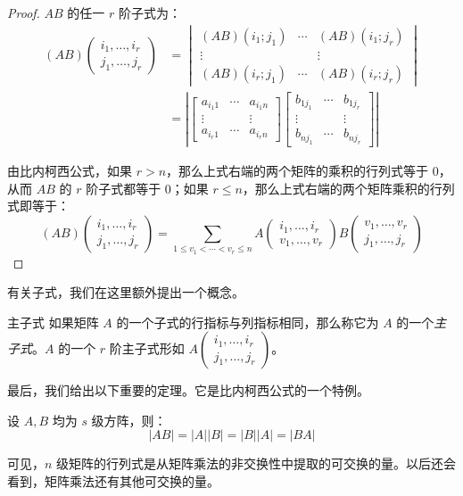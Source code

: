 \begin{proof}
	$AB$ 的任一 $r$ 阶子式为：
	$$
	\begin{aligned}
		(AB) \begin{pmatrix} i_1, \ldots, i_r \\ j_1, \ldots, j_r \end{pmatrix} &=
		\begin{vmatrix}
			(AB)(i_1; j_1) & \cdots & (AB)(i_1; j_r)
			\\
			\vdots & & \vdots
			\\
			(AB)(i_r; j_1) & \cdots & (AB)(i_r; j_r)
		\end{vmatrix}
		\\&=
		\left|
		\begin{bmatrix}
			a_{i_1 1} & \cdots & a_{i_1 n}
			\\
			\vdots & & \vdots
			\\
			a_{i_r 1} & \cdots & a_{i_r n}
		\end{bmatrix}
		\begin{bmatrix}
			b_{1 j_1} & \cdots & b_{1 j_r}
			\\
			\vdots & & \vdots
			\\
			b_{n j_1} & \cdots & b_{n j_r}
		\end{bmatrix}
		\right|
	\end{aligned}
	$$

	由比内柯西公式，如果 $r > n$，那么上式右端的两个矩阵的乘积的行列式等于 $0$，从而 $AB$ 的 $r$ 阶子式都等于 $0$；如果 $r \le n$，那么上式右端的两个矩阵乘积的行列式即等于：
	$$
	(AB) \begin{pmatrix} i_1, \ldots, i_r \\ j_1, \ldots, j_r \end{pmatrix} = \sum\limits_{1 \le v_1 < \cdots < v_r \le n} A \begin{pmatrix} i_1, \ldots, i_r \\ v_1, \ldots, v_r \end{pmatrix} B \begin{pmatrix} v_1, \ldots, v_r \\ j_1, \ldots, j_r \end{pmatrix}
	$$
\end{proof}

有关子式，我们在这里额外提出一个概念。

\begin{definition}{主子式}
	如果矩阵 $A$ 的一个子式的行指标与列指标相同，那么称它为 $A$ 的一个\emph{主子式}。$A$ 的一个 $r$ 阶主子式形如 $A \begin{pmatrix} i_1, \ldots, i_r \\ j_1, \ldots, j_r \end{pmatrix}$。
\end{definition}

最后，我们给出以下重要的定理。它是比内柯西公式的一个特例。

\begin{theorem}
	设 $A, B$ 均为 $s$ 级方阵，则：
	$$
	|AB| = |A| |B| = |B| |A| = |BA|
	$$
\end{theorem}

可见，$n$ 级矩阵的行列式是从矩阵乘法的非交换性中提取的可交换的量。以后还会看到，矩阵乘法还有其他可交换的量。